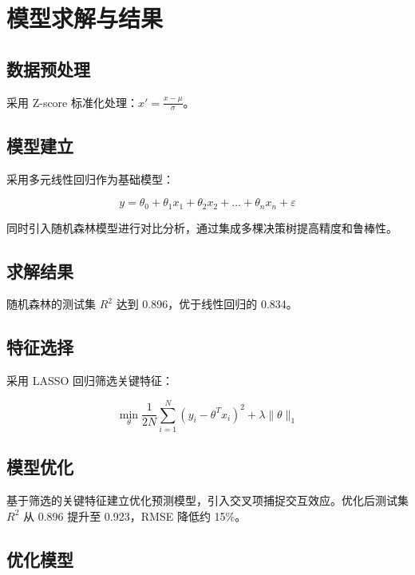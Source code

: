 \section{模型求解与结果}

\subsection{数据预处理}

采用 Z-score 标准化处理：$x' = \frac{x - \mu}{\sigma}$。

\subsection{模型建立}

采用多元线性回归作为基础模型：

\begin{equation}
y = \theta_0 + \theta_1 x_1 + \theta_2 x_2 + \dots + \theta_n x_n + \varepsilon
  \label{eq:4-solution-1}
\end{equation}

同时引入随机森林模型进行对比分析，通过集成多棵决策树提高精度和鲁棒性。

\subsection{求解结果}

随机森林的测试集 $R^2$ 达到 0.896，优于线性回归的 0.834。

\subsection{特征选择}

采用 LASSO 回归筛选关键特征：

\begin{equation}
\min_{\theta} \frac{1}{2N} \sum_{i=1}^{N} (y_i - \theta^T x_i)^2 + \lambda \|\theta\|_1
  \label{eq:4-solution-2}
\end{equation}

\subsection{模型优化}

基于筛选的关键特征建立优化预测模型，引入交叉项捕捉交互效应。优化后测试集 $R^2$ 从 0.896 提升至 0.923，RMSE 降低约 15\%。

\subsection{优化模型}


